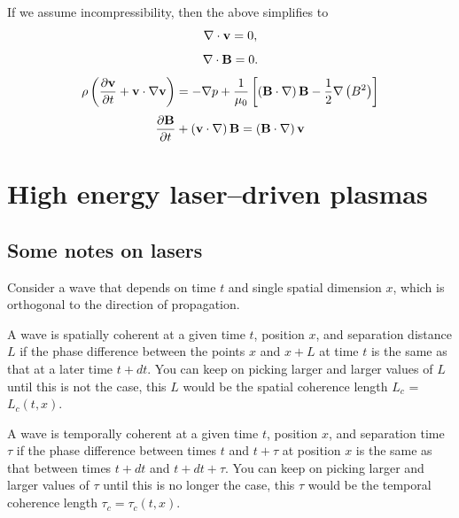 \documentclass[a4paper,11pt]{report}
\begin{document}
If we assume incompressibility, then the above simplifies to
\begin{equation}
    \nabla \cdot \mathbf{v} = 0,
\end{equation}
\begin{equation}
    \nabla \cdot \mathbf{B} = 0.
    \end{equation}
\begin{equation}
    \rho \left (\frac{\partial \mathbf{v}}{\partial t} + \mathbf{v} \cdot \nabla \mathbf{v} \right ) = - \nabla p  + \frac{1}{\mu_0} \left [ \left ( \mathbf{B} \cdot \nabla \right ) \mathbf{B} - \frac{1}{2} \nabla \left ( B^2 \right ) \right ]
\end{equation}
\begin{equation}
    \frac{\partial \mathbf{B}}{\partial t} + \left ( \mathbf{v} \cdot \nabla \right ) \mathbf{B} = \left ( \mathbf{B} \cdot \nabla \right ) \mathbf{v}
\end{equation}

\part{High energy laser--driven plasmas}

\chapter{Some notes on lasers}
Consider a wave that depends on time $t$ and single spatial dimension $x$, which is orthogonal to the direction of propagation. 

A wave is spatially coherent at a given time $t$, position $x$, and separation distance $L$ if the phase difference between the points $x$ and $x+L$ at time $t$ is the same as that at a later time $t+dt$. You can keep on picking larger and larger values of $L$ until this is not the case, this $L$ would be the spatial coherence length $L_c$ = $L_c(t,x)$.

A wave is temporally coherent at a given time $t$, position $x$, and separation time $\tau$ if the phase difference between times $t$ and $t+\tau$ at position $x$ is the same as that between times $t+dt$ and $t+dt+\tau$. You can keep on picking larger and larger values of $\tau$ until this is no longer the case, this $\tau$ would be the temporal coherence length $\tau_c = \tau_c(t,x)$.
\end{document}

